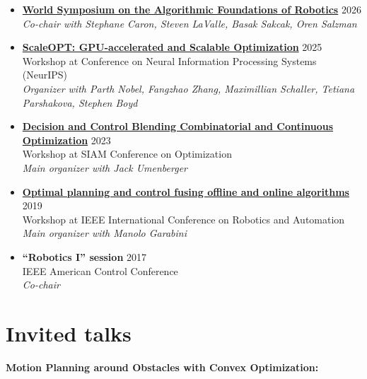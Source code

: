 \documentclass[11pt,a4paper,sans]{moderncv}
\begin{document}
\begin{itemize}

\item \href{https://wafr2026.github.io}{\color{cyan}\textbf{World Symposium on the Algorithmic Foundations of Robotics}} \hfill 2026 \\
\emph{Co-chair with Stephane Caron, Steven LaValle,  Basak Sakcak, Oren Salzman}

\item \href{https://www.cvxgrp.org/scaleopt/}{\color{cyan}\textbf{ScaleOPT: GPU-accelerated and Scalable Optimization}} \hfill 2025 \\
Workshop at Conference on Neural Information Processing Systems (NeurIPS) \\
\emph{Organizer with Parth Nobel, Fangzhao Zhang, Maximillian Schaller, Tetiana Parshakova, Stephen Boyd}

\item \href{https://meetings.siam.org/sess/dsp_programsess.cfm?SESSIONCODE=76788}{\color{cyan}\textbf{Decision and Control Blending Combinatorial and Continuous Optimization}} \hfill 2023 \\
Workshop at SIAM Conference on Optimization \\
\emph{Main organizer with Jack Umenberger}

\item \href{https://sites.google.com/mit.edu/icra19ws}{\color{cyan}\textbf{Optimal planning and control fusing offline and online algorithms}} \hfill 2019 \\
Workshop at IEEE International Conference on Robotics and Automation \\
\emph{Main organizer with Manolo Garabini}

\item \textbf{``Robotics I'' session} \hfill 2017 \\
IEEE American Control Conference \\
\emph{Co-chair}

\end{itemize}

\section{Invited talks}


\textbf{Motion Planning around Obstacles with Convex Optimization:}
\end{document}
